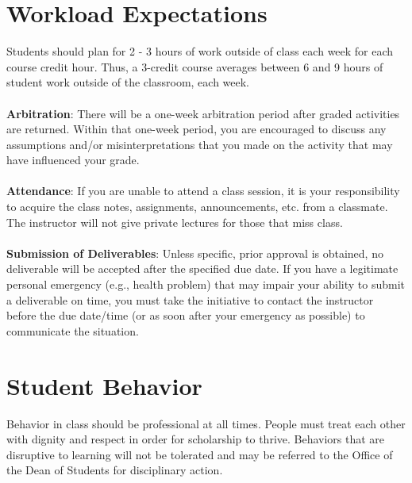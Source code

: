 \documentclass{article}
\begin{document}
\section{Workload Expectations}
Students should plan for 2 - 3 hours of work outside of class each week for each course credit hour. Thus, a 3-credit course averages between 6 and 9 hours of student work outside of the classroom, each week.
\\
\\
\textbf{Arbitration}: There will be a one-week arbitration period after graded activities are returned. Within that one-week period, you are encouraged to discuss any assumptions and/or misinterpretations that you made on the activity that may have inﬂuenced your grade.
\\
\\
\textbf{Attendance}: If you are unable to attend a class session, it is your responsibility to acquire the class notes, assignments, announcements, etc. from a classmate. The instructor will not give private lectures for those that miss class.
\\
\\
\textbf{Submission of Deliverables}: Unless speciﬁc, prior approval is obtained, no deliverable will be accepted after the speciﬁed due date. If you have a legitimate personal emergency (e.g., health problem) that may impair your ability to submit a deliverable on time, you must take the initiative to contact the instructor before the due date/time (or as soon after your emergency as possible) to communicate the situation. 


\section{Student Behavior}
Behavior in class should be professional at all times. People must treat each other with dignity and respect in order for scholarship to thrive. Behaviors that are disruptive to learning will not be tolerated and may be referred to the Oﬃce of the Dean of Students for disciplinary action.
\end{document}
